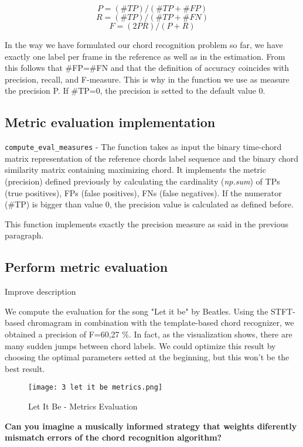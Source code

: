 \documentclass{article}
\begin{document}
\[P=(\#TP)/(\#TP + \#FP)\]
\[R=(\#TP)/(\#TP + \#FN)\]
\[F=(2PR)/(P + R)\]

In the way we have formulated our chord recognition problem so far, we have exactly one label per frame in the reference as well as in the estimation. From this follows that \#FP=\#FN and that the definition of accuracy coincides with precision, recall, and F-measure. This is why in the function we use as measure the precision P. If \#TP=0, the precision is setted to the default value 0.

\subsection*{Metric evaluation implementation}

\verb|compute_eval_measures| -  The function takes as input the binary time-chord matrix representation of the reference chords label sequence and the binary chord similarity matrix containing maximizing chord.
It implements the metric (precision) defined previously by calculating the cardinality (\textit{np.sum}) of TPs (true positives), FPs (false positives), FNs (false negatives). If the numerator (#TP) is bigger than value 0, the precision value is calculated as defined before.


This function implements exactly the precision measure as said in the previous paragraph.

\subsection*{Perform metric evaluation}

\color{red}Improve description\color{black}

We compute the evaluation for the song "Let it be" by Beatles.
Using the STFT-based chromagram in combination with the template-based chord recognizer, we obtained a precision of F=60,27 \begin{math}\% \end{math}. In fact, as the visualization shows, there are many sudden jumps between chord labels. We could optimize this result by choosing the optimal parameters setted at the beginning, but this won't be the best result.


\begin{figure}[H]
 \centering
 \texttt{[image: 3 let it be metrics.png]}
 \caption{Let It Be - Metrics Evaluation}
\end{figure}

\begin{problem}
	\textbf{Can you imagine a musically informed strategy that weights diferently mismatch errors of
the chord recognition algorithm?}
\end{problem}
\end{document}
